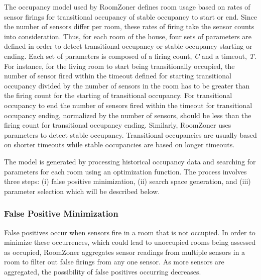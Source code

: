 
The occupancy model used by RoomZoner defines room usage based on rates
of sensor firings for transitional occupancy of stable occupancy to start or
end. Since the number of sensors differ per room, these rates of firing take the
sensor counts into consideration. Thus, for each room of the house, four sets of
parameters are defined in order to detect transitional occupancy or stable
occupancy starting or ending. Each set of parameters is composed of a firing
count, {\em C} and a timeout, {\em T}. For instance, for the living room to
start being transitionally occupied, the number of sensor fired within the
timeout defined for starting transitional occupancy divided by the number of
sensors in the room has to be greater than the firing count for the starting of
transitional occupancy. For transitional occupancy to end the number of sensors
fired within the timeout for transitional occupancy ending, normalized by the
number of sensors, should be less than the firing count for transitional
occupancy ending. Similarly, RoomZoner uses parameters to detect stable
occupancy. Transitional occupancies are usually based on shorter timeouts while
stable occupancies are based on longer timeouts.


The model is generated by processing historical occupancy data and searching for
parameters for each room using an optimization function. The process involves
three steps: (i) false positive minimization, (ii) search space generation, and
(iii) parameter selection which will be described below.

\subsubsection{False Positive Minimization}
False positives occur when sensors fire in a room that is not occupied. In order
to minimize these occurrences, which could lead to unoccupied rooms being
assessed as occupied, RoomZoner aggregates sensor readings from multiple sensors
in a room to filter out false firings from any one sensor. As more sensors are
aggregated, the possibility of false positives occurring decreases.

